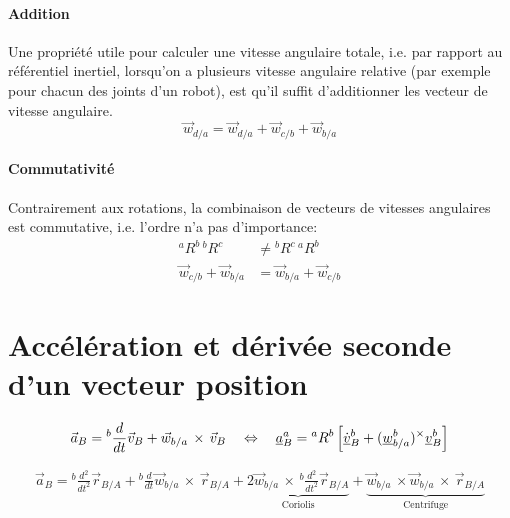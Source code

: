 \paragraph{Addition} Une propriété utile pour calculer une vitesse angulaire totale, i.e. par rapport au référentiel inertiel, lorsqu'on a plusieurs vitesse angulaire relative (par exemple pour chacun des joints d'un robot), est qu'il suffit d'additionner les vecteur de vitesse angulaire. 
\begin{equation}
\vec{w}_{d/a} = \vec{w}_{d/a}  + \vec{w}_{c/b} + \vec{w}_{b/a} 
\label{eq:angspeedadd}
\end{equation}
\paragraph{Commutativité} Contrairement aux rotations, la combinaison de vecteurs de vitesses angulaires est commutative, i.e. l'ordre n'a pas d'importance:
\begin{align}
{}^aR^b \, {}^bR^c  &\neq {}^bR^c \, {}^aR^b  \\
\vec{w}_{c/b} + \vec{w}_{b/a}  &= \vec{w}_{b/a}  + \vec{w}_{c/b}
\end{align}



\newpage
\section{Accélération et dérivée seconde d'un vecteur position}
\label{sec:acc}



\begin{align}
\vec{a}_{B} = {}^{b}\frac{d}{dt} \vec{v}_{B} +  \vec{w}_{b/a} \, \times \, \vec{v}_{B}
\quad \Leftrightarrow \quad 
\underline{a}_{B}^{a} = {}^{a}R^b \left[ \underline{\dot{v}}^b_{B} +  (\underline{w}_{b/a}^b)^{\times} \underline{v}^b_{B}  \right] 
\end{align}

\begin{align}
\vec{a}_{B} = 
{}^{b}\frac{d^2}{dt^2} \vec{r}_{B/A} 
+  
{}^{b}\frac{d}{dt} \vec{w}_{b/a} \, \times \, \vec{r}_{B/A}
+
\underbrace{
2 \vec{w}_{b/a} \, \times \, {}^{b}\frac{d^2}{dt^2} \vec{r}_{B/A}
}_{\text{Coriolis}}
+
\underbrace{
\vec{w}_{b/a} \, \times \vec{w}_{b/a} \, \times \,
\vec{r}_{B/A}
}_{\text{Centrifuge}}
\end{align}


